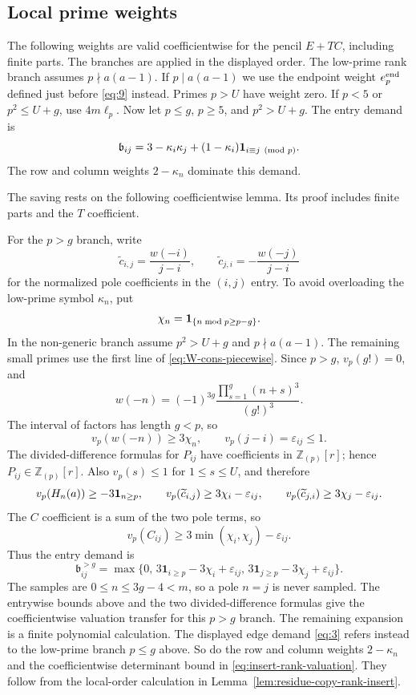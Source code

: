 \subsection{Local prime weights}

The following weights are valid coefficientwise for the pencil $E+TC$,
including finite parts. The branches are applied in the displayed order.
The low-prime rank branch assumes $p\nmid a(a-1)$. If
$p\mid a(a-1)$ we use the endpoint weight $e_p^{\rm end}$ defined just before
\eqref{eq:9} instead. Primes $p>U$ have weight
zero. If $p<5$ or $p^2\le U+g$, use $4m\ell_p$. Now let $p\le g$, $p\ge5$,
and $p^2>U+g$. The entry demand is
\begin{equation}
 \mathfrak b_{ij}=3-\kappa_i\kappa_j+
             (1-\kappa_i){\bf1}_{i\equiv j\pmod p}.       \label{eq:3}
\end{equation}
The row and column weights $2-\kappa_n$ dominate this demand.

The saving rests on the following coefficientwise lemma. Its proof
includes finite parts and the $T$ coefficient.


For the $p>g$ branch, write
\[
 \widetilde c_{i,j}=\frac{w(-i)}{j-i},\qquad
 \widetilde c_{j,i}=-\frac{w(-j)}{j-i}
\]
for the normalized pole coefficients in the $(i,j)$ entry. To avoid
overloading the low-prime symbol $\kappa_n$, put
\[
 \chi_n={\bf1}_{\{n\bmod p\ge p-g\}}.
\]
In the non-generic branch assume $p^2>U+g$ and $p\nmid a(a-1)$. The
remaining small primes use the first line of \eqref{eq:W-cons-piecewise}.
Since $p>g$, $v_p(g!)=0$, and
\[
 w(-n)=(-1)^{3g}\frac{\prod_{s=1}^{g}(n+s)^3}{(g!)^3}.
\]
The interval of factors has length $g<p$, so
\[
 v_p(w(-n))\ge3\chi_n,
 \qquad v_p(j-i)=\varepsilon_{ij}\le1.
\]
The divided-difference formulas for $P_{ij}$ have coefficients in
$\mathbb Z_{(p)}[r]$; hence $P_{ij}\in\mathbb Z_{(p)}[r]$. Also
$v_p(s)\le1$ for $1\le s\le U$, and therefore
\[
 v_p(H_n(a))\ge-3{\bf1}_{n\ge p},\qquad
 v_p(\widetilde c_{i,j})\ge3\chi_i-\varepsilon_{ij},\qquad
 v_p(\widetilde c_{j,i})\ge3\chi_j-\varepsilon_{ij}.
\]
The $C$ coefficient is a sum of the two pole terms, so
\[
 v_p(C_{ij})\ge3\min(\chi_i,\chi_j)-\varepsilon_{ij}.
\]
Thus the entry demand is
\[
\mathfrak b_{ij}^{>g}=\max\{0,\,3\mathbf1_{i\ge p}-3\chi_i+\varepsilon_{ij},\,
                    3\mathbf1_{j\ge p}-3\chi_j+\varepsilon_{ij}\}.
\]
The samples are $0\le n\le3g-4<m$, so a pole $n=j$ is never sampled. The
entrywise bounds above and the two divided-difference formulas give the
coefficientwise valuation transfer for this $p>g$ branch. The remaining
expansion is a finite polynomial calculation. The displayed edge demand
\eqref{eq:3} refers instead to the low-prime branch $p\le g$ above. So do
the row and column weights $2-\kappa_n$ and the coefficientwise determinant
bound in \eqref{eq:insert-rank-valuation}. They follow from the local-order
calculation in Lemma~\ref{lem:residue-copy-rank-insert}.

